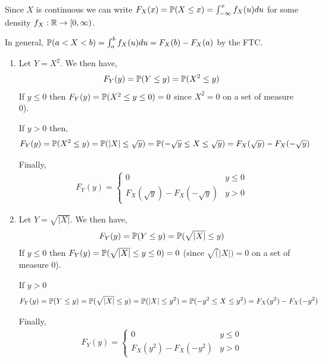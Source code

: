 \documentclass[10pt]{article}
\begin{document}
\begin{solution}[Solution]
Since \( X \) is continuous we can write \( F_X(x) = \mathbb{P}(X\leq x) = \int_{-\infty}^{x}f_X(u)du \) for some density \( f_X: \mathbb{R}\to[0,\infty) \).

In general, \( \mathbb{P}(a<X<b) = \int_{a}^{b}f_X(u)du = F_X(b)-F_X(a) \) by the FTC.

\begin{enumerate}
    \item[(a)]
        Let \( Y=X^2 \). We then have,
        \begin{align*}
            F_Y(y) = \mathbb{P}(Y\leq y) = \mathbb{P}(X^2\leq y) 
        \end{align*}
        If \( y\leq0 \) then \( F_Y(y)=\mathbb{P}(X^2\leq y\leq 0) = 0 \) since \( X^2=0 \) on a set of measure 0).
        
        If \( y> 0 \) then,
        \begin{align*}
            F_Y(y) &= \mathbb{P}(X^2\leq y) = \mathbb{P}(|X|\leq \sqrt{y}) = \mathbb{P}(-\sqrt{y}\leq X\leq \sqrt{y}) = F_X(\sqrt{y})-F_X(-\sqrt{y})
        \end{align*}

        Finally,
\begin{align*}
    F_Y(y) = \begin{cases}
        0 & y \leq 0 \\
        F_X(\sqrt{y})-F_X(-\sqrt{y})  & y> 0
    \end{cases}
\end{align*}

	\item[(b)]
        Let \( Y=\sqrt{|X|} \). We then have,
        \begin{align*}
            F_Y(y) = \mathbb{P}(Y\leq y) = \mathbb{P}(\sqrt{|X|}\leq y)
        \end{align*}
        If \( y\leq0 \) then \( F_Y(y)=\mathbb{P}(\sqrt{|X|}\leq y\leq0) = 0 \) (since \( \sqrt(|X|)=0 \) on a set of measure 0).

        If \( y>0 \)
        \begin{align*}
            F_Y(y) = \mathbb{P}(Y\leq y) = \mathbb{P}(\sqrt{|X|}\leq y) = \mathbb{P}(|X|\leq y^2) = \mathbb{P}(-y^2\leq X\leq y^2) = F_X(y^2)-F_X(-y^2)
        \end{align*}
        
        Finally,
        \begin{align*}
            F_Y(y) = 
            \begin{cases}
                0 & y\leq 0 \\
                F_X(y^2)-F_X(-y^2) & y > 0
            \end{cases}
        \end{align*}


\end{enumerate}
\end{solution}
\end{document}
